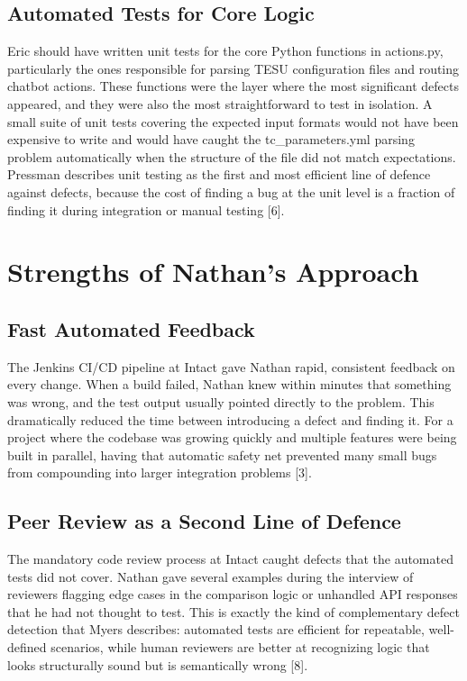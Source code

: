 \documentclass[sigconf]{acmart}
\begin{document}
\subsection{Automated Tests for Core Logic}

Eric should have written unit tests for the core Python functions in actions.py, particularly the ones responsible for parsing TESU configuration files and routing chatbot actions. These functions were the layer where the most significant defects appeared, and they were also the most straightforward to test in isolation. A small suite of unit tests covering the expected input formats would not have been expensive to write and would have caught the tc\_parameters.yml parsing problem automatically when the structure of the file did not match expectations. Pressman describes unit testing as the first and most efficient line of defence against defects, because the cost of finding a bug at the unit level is a fraction of finding it during integration or manual testing [6].

\section{Strengths of Nathan's Approach}

\subsection{Fast Automated Feedback}

The Jenkins CI/CD pipeline at Intact gave Nathan rapid, consistent feedback on every change. When a build failed, Nathan knew within minutes that something was wrong, and the test output usually pointed directly to the problem. This dramatically reduced the time between introducing a defect and finding it. For a project where the codebase was growing quickly and multiple features were being built in parallel, having that automatic safety net prevented many small bugs from compounding into larger integration problems [3].

\subsection{Peer Review as a Second Line of Defence}

The mandatory code review process at Intact caught defects that the automated tests did not cover. Nathan gave several examples during the interview of reviewers flagging edge cases in the comparison logic or unhandled API responses that he had not thought to test. This is exactly the kind of complementary defect detection that Myers describes: automated tests are efficient for repeatable, well-defined scenarios, while human reviewers are better at recognizing logic that looks structurally sound but is semantically wrong [8].
\end{document}
